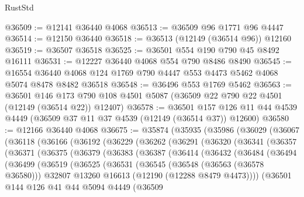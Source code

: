 \begin{lexlean}{RustStd}
\begin{coremodule}
@36509 := @12141 @36440 @4068
@36513 := @36509 @96 @1771 @96 @4447
@36514 := @12150 @36440
@36518 := @36513 (@12149 (@36514 @96)) @12160
@36519 := @36507 @36518
@36525 := @36501 @554 @190 @790 @45 @8492 @16111
@36531 := @12227 @36440 @4068 @554 @790 @8486 @8490
@36545 := @16554 @36440 @4068 @124 @1769 @790 @4447 @553 @4473 @5462 @4068 @5074 @8478 @8482 @36518
@36548 := @36496 @553 @1769 @5462
@36563 := @36501
    @146
    @173
    @790
    @108
    @4501
    @5087
    (@36509 @22 @790 @22 @4501 (@12149 (@36514 @22)) @12407)
@36578 := @36501
    @157
    @126
    @11
    @44
    @4539
    @4449
    (@36509 @37 @11 @37 @4539 (@12149 (@36514 @37)) @12600)
@36580 := @12166 @36440 @4068
@36675 := @35874
    (@35935
      (@35986
        (@36029
          (@36067
            (@36118
              (@36166
                (@36192
                  (@36229
                    (@36262
                      (@36291
                        (@36320
                          (@36341
                            (@36357
                              (@36371
                                (@36375
                                  (@36379
                                    (@36383
                                      (@36387
                                        (@36414
                                          (@36432
                                            (@36484
                                              (@36494
                                                (@36499
                                                  (@36519
                                                    (@36525
                                                      (@36531
                                                        (@36545
                                                          (@36548 (@36563 (@36578 @36580)))
                                                          @32807
                                                          @13260
                                                          @16613
                                                          (@12190 (@12288 @8479 @4473))))
                                                      (@36501
                                                        @144
                                                        @126
                                                        @41
                                                        @44
                                                        @5094
                                                        @4449
                                                        (@36509

\end{coremodule}
\end{lexlean}
